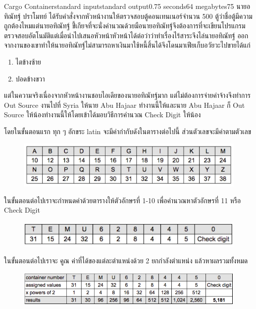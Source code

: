 \documentclass[11pt,a4paper]{article}
\begin{document}
\begin{problem}{Cargo Container}{standard input}{standard output}{0.75 seconds}{64 megabytes}{75}
นายอทิณัทฐ์ ปราโมทย์ ได้รับคำสั่งจากหัวหน้างานให้ตรวจสอบตู้คอนเทนเนอร์จำนวน 500 ตู้ว่าชื่อตู้มีความถูกต้องไหมแต่นายอทิณัทฐ์ ขี้่เกียจที่จะนั่งคำนวณด้วยมือนายอทิณัทฐ์จึงต้องการที่จะเขียนโปรแกรมตรวจสอบอัตโนมัติแต่เมื่อนำไปเสนอหัวหน้าหัวหน้าได้ต่อว่าว่าทำเรื่องไร้สาระจึงไล่นายอทิณัทฐ์ ออกจากงานของเขาทำให้นายอทิณัทฐ์ไม่สามารถหาเงินมาใช้หนี้สิ้นได้จึงโดนมาเฟียเก็บอวัยวะไปขายได้แก่

\begin{enumerate}
    \item ไตข้างซ้าย
    \item ปอดข้างขวา
\end{enumerate}

แต่ในความจริงเนื่องจากหัวหน้างานชอบไอเดียของนายอทิณัทฐ์มาก แต่ไม่ต้องการจ่ายค่าจ้างจึงทำการ Out Source งานไปที่ Syria ให้นาย Abu Hajaar ทำงานนี้ให้และนาย Abu Hajaar ก็ Out Source ให้น้องทำงานนี้ให้โดยเข้าได้มอบวิธีการคำนวณ Check Digit ให้น้อง

โดยในขั้นตอนแรก ทุก ๆ อักขระ latin จะมีค่ากำกับดังในตารางต่อไปนี้ ส่วนตัวเลขจะมีค่าตามตัวเลข
\begin{figure}[htp]
    \centering
    \includegraphics[width=12cm]{cargocontainercheck/value.jpg}
\end{figure}

ในขั้นตอนต่อไปเราจะกำหนดค่าด้วยตารางให้ตัวอักษรที่ 1-10 เพื่อคำนวณหาตัวอักษรที่ 11 หรือ Check Digit

\begin{figure}[htp]
    \centering
    \includegraphics[width=12cm]{cargocontainercheck/assigned.jpg}
\end{figure}

ในขั้นตอนต่อไปเราจะ คูณ ค่าที่ได้ของแต่ละตำแหน่งด้วย 2 ยกกำลังตำแหน่ง แล้วหาผลรวมทั้งหมด

\begin{figure}[htp]
    \centering
    \includegraphics[width=12cm]{cargocontainercheck/power.png}
    \end{figure}
\newpage


\end{problem}
\end{document}
